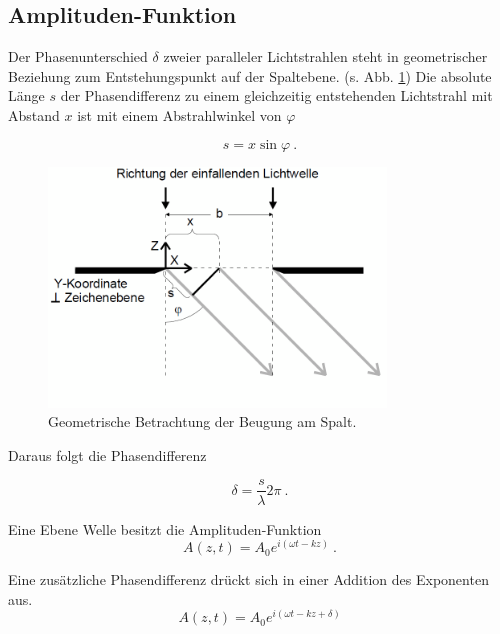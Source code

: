 \subsection{Amplituden-Funktion}
Der Phasenunterschied $\delta$ zweier paralleler Lichtstrahlen steht in geometrischer Beziehung zum Entstehungspunkt auf der Spaltebene. (s. Abb. \ref{fig:BeugSpalt})
Die absolute Länge $s$ der Phasendifferenz zu einem gleichzeitig entstehenden Lichtstrahl mit Abstand $x$ ist mit einem Abstrahlwinkel von $\varphi$

\begin{equation}
  s = x\sin{\varphi} \:.
  \label{eqn:s}
\end{equation}

\begin{figure}
  \centering
  \includegraphics[width=0.8\textwidth]{plots/Beugung Einzelspalt.png}
  \caption{Geometrische Betrachtung der Beugung am Spalt.}
  \label{fig:BeugSpalt}
\end{figure}

Daraus folgt die Phasendifferenz

\begin{equation}
  \delta = \frac{s}{\lambda}2\pi \:.
  \label{eqn:delta}
\end{equation}



Eine Ebene Welle besitzt die Amplituden-Funktion 
\begin{equation}
  A(z, t) = A_0e^{i(\omega t - kz)} \:.
\end{equation}

Eine zusätzliche Phasendifferenz drückt sich in einer Addition des Exponenten aus.
\begin{equation*}
  A(z, t) = A_0e^{i(\omega t - kz + \delta)}
\end{equation*}

